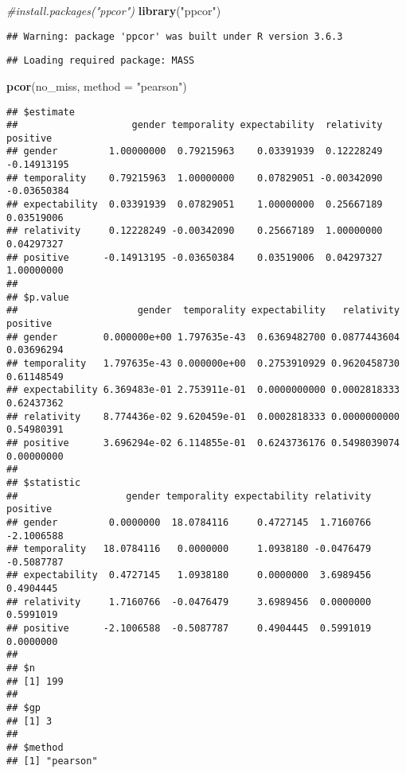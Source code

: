 \documentclass[
]{article}
\newenvironment{Shaded}{\begin{snugshade}}{\end{snugshade}}
\newcommand{\CommentTok}[1]{\textcolor[rgb]{0.56,0.35,0.01}{\textit{#1}}}
\newcommand{\DataTypeTok}[1]{\textcolor[rgb]{0.13,0.29,0.53}{#1}}
\newcommand{\KeywordTok}[1]{\textcolor[rgb]{0.13,0.29,0.53}{\textbf{#1}}}
\newcommand{\NormalTok}[1]{#1}
\newcommand{\StringTok}[1]{\textcolor[rgb]{0.31,0.60,0.02}{#1}}
\begin{document}
\begin{Shaded}
\begin{Highlighting}[]
\CommentTok{#install.packages("ppcor")}
\KeywordTok{library}\NormalTok{(}\StringTok{"ppcor"}\NormalTok{)}
\end{Highlighting}
\end{Shaded}

\begin{verbatim}
## Warning: package 'ppcor' was built under R version 3.6.3
\end{verbatim}

\begin{verbatim}
## Loading required package: MASS
\end{verbatim}

\begin{Shaded}
\begin{Highlighting}[]
\KeywordTok{pcor}\NormalTok{(no_miss, }\DataTypeTok{method =} \StringTok{"pearson"}\NormalTok{)}
\end{Highlighting}
\end{Shaded}

\begin{verbatim}
## $estimate
##                    gender temporality expectability  relativity    positive
## gender         1.00000000  0.79215963    0.03391939  0.12228249 -0.14913195
## temporality    0.79215963  1.00000000    0.07829051 -0.00342090 -0.03650384
## expectability  0.03391939  0.07829051    1.00000000  0.25667189  0.03519006
## relativity     0.12228249 -0.00342090    0.25667189  1.00000000  0.04297327
## positive      -0.14913195 -0.03650384    0.03519006  0.04297327  1.00000000
## 
## $p.value
##                     gender  temporality expectability   relativity   positive
## gender        0.000000e+00 1.797635e-43  0.6369482700 0.0877443604 0.03696294
## temporality   1.797635e-43 0.000000e+00  0.2753910929 0.9620458730 0.61148549
## expectability 6.369483e-01 2.753911e-01  0.0000000000 0.0002818333 0.62437362
## relativity    8.774436e-02 9.620459e-01  0.0002818333 0.0000000000 0.54980391
## positive      3.696294e-02 6.114855e-01  0.6243736176 0.5498039074 0.00000000
## 
## $statistic
##                   gender temporality expectability relativity   positive
## gender         0.0000000  18.0784116     0.4727145  1.7160766 -2.1006588
## temporality   18.0784116   0.0000000     1.0938180 -0.0476479 -0.5087787
## expectability  0.4727145   1.0938180     0.0000000  3.6989456  0.4904445
## relativity     1.7160766  -0.0476479     3.6989456  0.0000000  0.5991019
## positive      -2.1006588  -0.5087787     0.4904445  0.5991019  0.0000000
## 
## $n
## [1] 199
## 
## $gp
## [1] 3
## 
## $method
## [1] "pearson"
\end{verbatim}
\end{document}
